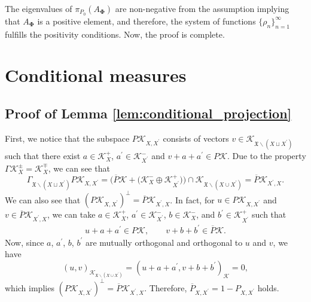 \documentclass[11pt]{article}
\numberwithin{equation}{section}
\numberwithin{equation}{section}
\newcommand{\pr}[1]{#1^{\prime}}
\newcommand{\mfrak}[1]{\mathfrak{#1}}
\newcommand{\mcal}[1]{\mathcal{#1}}
\begin{document}
The eigenvalues of $\pi_{P_{0}} (A_{\bm{\Phi}} )$ are non-negative from the assumption implying that $A_{\bm{\Phi}}$ is a positive element, and therefore, the system of functions $\{\rho_{n}\}_{n=1}^{\infty}$ fulfills the positivity conditions.
Now, the proof is complete.


\setcounter{section}{3}
\section{Conditional measures}\label{sect:conditional_measures}
\subsection{Proof of Lemma \ref{lem:conditional_projection}}
First, we notice that the subspace $P\mcal{K}_{X,\pr{X}}$ consists of vectors $v\in \mcal{K}_{\mfrak{X}\backslash(X\sqcup\pr{X})}$ such that there exist $a\in \mcal{K}_{X}^{+}$, $\pr{a}\in \mcal{K}_{\pr{X}}^{-}$ and $v+a+\pr{a}\in P\mcal{K}$. Due to the property $\Gamma \mcal{K}_{X}^{\pm}=\mcal{K}_{X}^{\mp}$, we can see that
\begin{equation*}
	\Gamma_{\mfrak{X}\backslash(X\sqcup\pr{X})} P\mcal{K}_{X,\pr{X}}=\big(\overline{P}\mcal{K}+\big(\mcal{K}_{X}^{-}\oplus \mcal{K}_{\pr{X}}^{+}\big)\big)\cap \mcal{K}_{\mfrak{X}\backslash (X\cup \pr{X})}=\overline{P}\mcal{K}_{\pr{X},X}.
\end{equation*}
We can also see that $ (P\mcal{K}_{X,\pr{X}})^{\perp}=\overline{P}\mcal{K}_{\pr{X},X}$. In fact, for $u\in P\mcal{K}_{X,\pr{X}}$ and $v\in \overline{P}\mcal{K}_{\pr{X},X}$, we can take $a\in \mcal{K}_{X}^{+}$, $\pr{a}\in \mcal{K}_{\pr{X}}^{-}$, $b\in \mcal{K}_{X}^{-}$, and $\pr{b}\in \mcal{K}_{\pr{X}}^{+}$ such that
\begin{gather*}
	u+a+\pr{a} \in P\mcal{K}, \qquad v+b+\pr{b}\in \overline{P}\mcal{K}.
\end{gather*}
Now, since $a$, $\pr{a}$, $b$, $\pr{b}$ are mutually orthogonal and orthogonal to $u$ and $v$, we have
\begin{equation*}
	(u,v)_{\mcal{K}_{\mfrak{X}\backslash (X\cup\pr{X})}}=(u+a+\pr{a},v+b+\pr{b})_{\mcal{K}}=0,
\end{equation*}
which implies $(P\mcal{K}_{X,\pr{X}})^{\perp}=\overline{P}\mcal{K}_{\pr{X},X}$.
Therefore, $\overline{P}_{X,\pr{X}}=1-P_{X,\pr{X}}$ holds.
\end{document}
